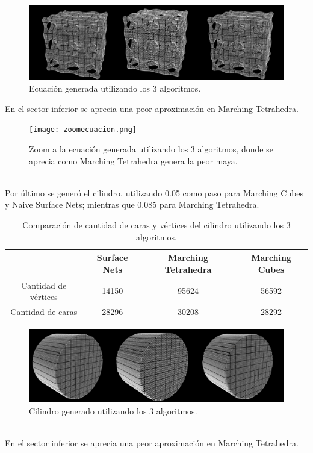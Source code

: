 \documentclass[12pt]{article}
\begin{document}
\clearpage
\begin{figure}[h!]
\includegraphics[width=\linewidth,center]{ecuacion2.png}
\caption{Ecuación generada utilizando los 3 algoritmos.}
\end{figure}
En el sector inferior se aprecia una peor aproximación en Marching Tetrahedra.
\begin{figure}[h!]
\texttt{[image: zoomecuacion.png]}
\caption{Zoom a la ecuación generada utilizando los 3 algoritmos, donde se aprecia como Marching Tetrahedra genera la peor maya.}
\end{figure}
\\Por último se generó el cilindro, utilizando 0.05 como paso para Marching Cubes y Naive Surface Nets; mientras que 0.085 para Marching Tetrahedra.
\begin{table}[h!]
  \centering
  \label{tab:table1}
  \begin{tabular}{cccc}
    \toprule
    & Surface Nets & Marching Tetrahedra & Marching Cubes\\
    \midrule
    Cantidad de vértices & 14150 &  95624 & 56592 \\
    Cantidad de caras &  28296 & 30208 & 28292 \\
    \bottomrule
  \end{tabular}
  \caption{Comparación de cantidad de caras y vértices del cilindro utilizando los 3 algoritmos.}
\end{table}
\begin{figure}[h!]
\includegraphics[width=\linewidth,center]{cilindro2.png}
\caption{Cilindro generado utilizando los 3 algoritmos.}
\end{figure}
\\En el sector inferior se aprecia una peor aproximación en Marching Tetrahedra.
\end{document}
